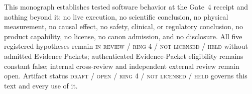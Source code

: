 \begin{boundary}\label{evid:bound:final}
This monograph establishes tested software behavior at the Gate~4 receipt and nothing beyond it: no live execution, no scientific conclusion, no physical measurement, no causal effect, no safety, clinical, or regulatory conclusion, no product capability, no license, no canon admission, and no disclosure. All five registered hypotheses remain \textsc{in review / ring 4 / not licensed / held} without admitted Evidence Packets; authenticated Evidence-Packet eligibility remains constant false; internal cross-review and independent external review remain open. Artifact status \textsc{draft / open / ring 4 / not licensed / held} governs this text and every use of it.
\end{boundary}
